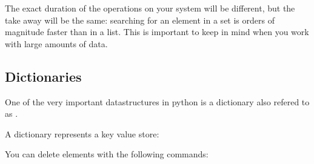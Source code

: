 The exact duration of the operations on your system will be different,
but the take away will be the same: searching for an element in a set
is orders of magnitude faster than in a list. This is important to
keep in mind when you work with large amounts of data.


\subsection{Dictionaries}
\label{\detokenize{lesson/prg/python_intro:dictionaries}}
One of the very important datastructures in python is a dictionary
also refered to as .

A dictionary represents a key value store:

\begin{sphinxVerbatim}[commandchars=\\\{\}]
       
\PYG{l+s+s2}{person[}\PYG{l+s+s2}{]: } \PYG{p}{[}\PYG{p}{]}
\PYG{l+s+s2}{person[}\PYG{l+s+s2}{]: } \PYG{p}{[}\PYG{p}{]}
\end{sphinxVerbatim}

You can delete elements with the following commands:


